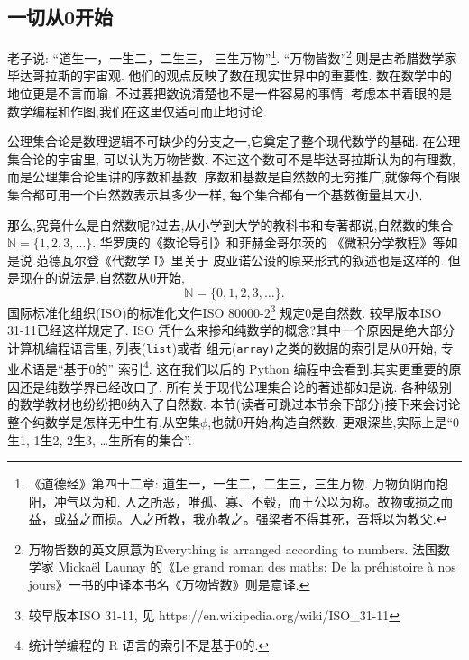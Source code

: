 \documentclass[main.tex]{subfiles}
\begin{document}
\subsection{一切从0开始}\label{chI.1.1}
老子说: “道生一，一生二，二生三，
三生万物”\footnote{《道德经》第四十二章: 道生一，一生二，二生三，三生万物. 万物负阴而抱阳，冲气以为和. 人之所恶，唯孤、寡、不毂，而王公以为称。故物或损之而益，或益之而损。人之所教，我亦教之。强梁者不得其死，吾将以为教父.}.
“万物皆数”\footnote{万物皆数的英文原意为Everything is arranged according to numbers. 
	法国数学家 Mickaël Launay 的《Le grand roman des maths: De la préhistoire à nos jours》一书的中译本书名《万物皆数》则是意译.}
则是古希腊数学家毕达哥拉斯的宇宙观. 他们的观点反映了数在现实世界中的重要性. 数在数学中的地位更是不言而喻.
不过要把数说清楚也不是一件容易的事情. 考虑本书着眼的是数学编程和作图,我们在这里仅适可而止地讨论. 

公理集合论是数理逻辑不可缺少的分支之一,它奠定了整个现代数学的基础. 在公理集合论的宇宙里, 可以认为万物皆数. 
不过这个数可不是毕达哥拉斯认为的有理数, 而是公理集合论里讲的序数和基数.
序数和基数是自然数的无穷推广,就像每个有限集合都可用一个自然数表示其多少一样,
每个集合都有一个基数衡量其大小.

那么,究竟什么是自然数呢?过去,从小学到大学的教科书和专著都说,自然数的集合$\mathbb{N} = \{1, 2, 3, \dots\}$.
华罗庚的《数论导引》\cite{HuaL}和菲赫金哥尔茨的
《微积分学教程》\cite{FeiH1}等如是说.范德瓦尔登《代数学 I》\cite{derWaerden}里关于
皮亚诺公设的原来形式的叙述也是这样的.
但是现在的说法是,自然数从0开始, 
$$\mathbb{N} = \{0,1, 2, 3, \dots\}.$$
 国际标准化组织(ISO)的标准化文件ISO 80000-2\footnote{较早版本ISO 31-11, 见  https://en.wikipedia.org/wiki/ISO\_31-11}
 规定0是自然数. 较早版本ISO 31-11已经这样规定了. ISO 凭什么来掺和纯数学的概念?其中一个原因是绝大部分计算机编程语言里,
 列表(\texttt{list})或者
 组元(\texttt{array)}之类的数据的索引是从0开始,
 专业术语是“基于0的”
 索引\footnote{统计学编程的 R 语言的索引不是基于0的.}.
 这在我们以后的 Python 编程中会看到.其实更重要的原因还是纯数学界已经改口了.
 所有关于现代公理集合论的著述都如是说\cite{HalmosP}\cite{KelleyJ}\cite{JiangJi}. 各种级别的数学教材也纷纷把0纳入了自然数.
 本节(读者可跳过本节余下部分)接下来会讨论整个纯数学是怎样无中生有,从空集$\phi$,也就0开始,构造自然数.
更艰深些,实际上是“0生1, 1生2, 2生3, \dots 生所有的集合”.
\end{document}

